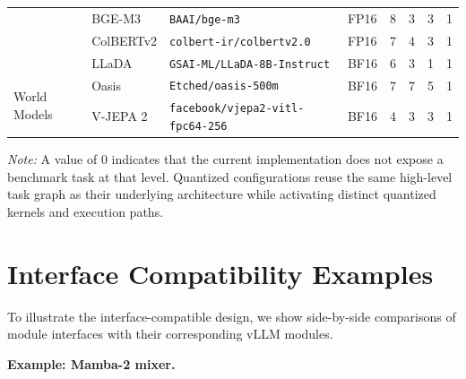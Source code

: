 \begin{table}[H]
\begin{tabular}{@{}ll>{\raggedright\arraybackslash}p{4.5cm}lcccc@{}}
   & BGE-M3             & \texttt{BAAI/\allowbreak bge-m3}                          & FP16 & 8  & 3  & 3 & 1 \\
   & ColBERTv2          & \texttt{colbert-ir/\allowbreak colbertv2.0}               & FP16 & 7  & 4  & 3 & 1 \\
   & LLaDA              & \texttt{GSAI-ML/\allowbreak LLaDA-8B-Instruct}            & BF16 & 6  & 3  & 1 & 1 \\
  \midrule
  \multirow{2}{*}{World Models}
   & Oasis              & \texttt{Etched/\allowbreak oasis-500m}                   & BF16 & 7  & 7  & 5 & 1 \\
   & V-JEPA 2           & \texttt{facebook/\allowbreak vjepa2-vitl-fpc64-256}      & BF16 & 4  & 3  & 3 & 1 \\
  \bottomrule
  \end{tabular}

  \vspace{4pt}
  {\small \textit{Note:} A value of 0 indicates that the current implementation does not expose a benchmark task at that level. Quantized configurations reuse the same high-level task graph as their underlying architecture while activating distinct quantized kernels and execution paths.}
\end{table}


\section{Interface Compatibility Examples}
\label{app:interface}

To illustrate the interface-compatible design, we show side-by-side comparisons of \fastkernels{} module interfaces with their corresponding vLLM modules.

  \medskip
  \noindent\textbf{Example: Mamba-2 mixer.}

